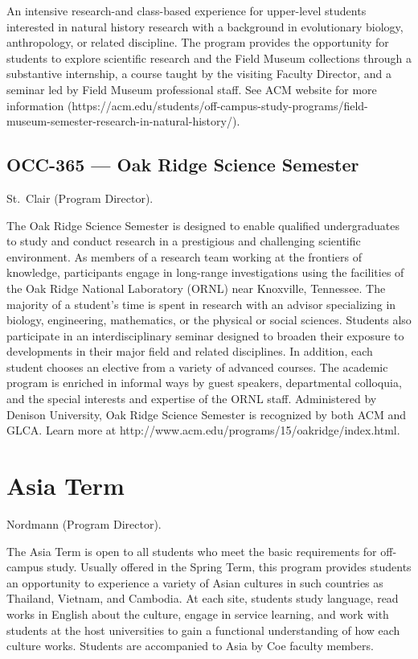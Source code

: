 \documentclass[
  letterpaper,
]{scrbook}
\begin{document}
An intensive research-and class-based experience for upper-level
students interested in natural history research with a background in
evolutionary biology, anthropology, or related discipline. The program
provides the opportunity for students to explore scientific research and
the Field Museum collections through a substantive internship, a course
taught by the visiting Faculty Director, and a seminar led by Field
Museum professional staff. See ACM website for more information
(https://acm.edu/students/off-campus-study-programs/field-museum-semester-research-in-natural-history/).

\subsection{OCC-365 --- Oak Ridge Science
Semester}\label{occ-365-oak-ridge-science-semester}

St.~Clair (Program Director).

The Oak Ridge Science Semester is designed to enable qualified
undergraduates to study and conduct research in a prestigious and
challenging scientific environment. As members of a research team
working at the frontiers of knowledge, participants engage in long-range
investigations using the facilities of the Oak Ridge National Laboratory
(ORNL) near Knoxville, Tennessee. The majority of a student's time is
spent in research with an advisor specializing in biology, engineering,
mathematics, or the physical or social sciences. Students also
participate in an interdisciplinary seminar designed to broaden their
exposure to developments in their major field and related disciplines.
In addition, each student chooses an elective from a variety of advanced
courses. The academic program is enriched in informal ways by guest
speakers, departmental colloquia, and the special interests and
expertise of the ORNL staff. Administered by Denison University, Oak
Ridge Science Semester is recognized by both ACM and GLCA. Learn more at
http://www.acm.edu/programs/15/oakridge/index.html.

\section{Asia Term}\label{asia-term}

Nordmann (Program Director).

The Asia Term is open to all students who meet the basic requirements
for off-campus study. Usually offered in the Spring Term, this program
provides students an opportunity to experience a variety of Asian
cultures in such countries as Thailand, Vietnam, and Cambodia. At each
site, students study language, read works in English about the culture,
engage in service learning, and work with students at the host
universities to gain a functional understanding of how each culture
works. Students are accompanied to Asia by Coe faculty members.
\end{document}
